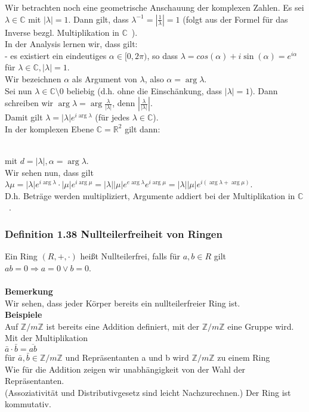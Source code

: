 \documentclass{article}
\newcommand{\lb}{\lambda}
\newcommand{\R}{\mathbb{R}}
\newcommand{\Z}{\mathbb{Z}}
\newcommand{\C}{\mathbb{C}}
\newcommand{\mR}{$\mathbb{R}$\ }
\newcommand{\mC}{$\mathbb{C}$\ }
\newcommand{\al}{\alpha}
\begin{document}
\begin{enumerate}
{Wir betrachten noch eine geometrische Anschauung der komplexen Zahlen. Es sei $\lb \in \C$ mit $|\lb| = 1$. Dann gilt, dass $\lb^{-1} = |\frac{1}{\lb}| = 1$  (folgt aus der Formel für das Inverse bezgl. Multiplikation in \mC).\\
In der Analysis lernen wir, dass gilt:\\
- es existiert ein eindeutiges $\al \in [0, 2\pi)$, so dass $\lb = cos(\al) + i \sin(\al) = e^{i\al}$ für $\lb \in \C, |\lb| = 1$.\\
Wir bezeichnen $\al$ als Argument von $\lb$, also $\al = \arg \lb$.\\
Sei nun $\lb \in \C \setminus 0$ beliebig (d.h. ohne die Einschänkung, dass $|\lb| = 1$). Dann schreiben wir $\arg \lb = \arg \frac{\lb}{|\lb|}$, denn $|\frac{\lb}{|\lb|}|$.\\
Damit gilt $\lb = |\lb| e^{i \arg \lb}$ (für jedes $\lb \in \C$).\\
In der komplexen Ebene $\C = \R^2$ gilt dann:\\
\\
mit $d = |\lb|, \al = \arg \lb$.\\
Wir sehen nun, dass gilt $\lb \mu = |\lb| e^{i \arg \lb} \cdot  |\mu| e^{i \arg \mu} = |\lb||\mu| e^{e \arg\lb} e^{i \arg \mu} = |\lb||\mu| e^{i (\arg\lb + \arg \mu)}$.\\
D.h. Beträge werden multipliziert, Argumente addiert bei der Multiplikation in \mC.
}
\end{enumerate}

\subsubsection{Definition 1.38 Nullteilerfreiheit von Ringen}
Ein Ring $(R, +, \cdot)$ hei\ss{}t Nullteilerfrei, falls für $a, b \in R$ gilt $ab = 0 \Rightarrow a = 0 \lor b = 0$.\\
\\
\textbf{Bemerkung}\\
Wir sehen, dass jeder Körper bereits ein nullteilerfreier Ring ist.\\
\textbf{Beispiele}\\
Auf $\Z/m\Z$ ist bereits eine Addition definiert, mit der $\Z/m\Z$ eine Gruppe wird. Mit der Multiplikation\\
$\bar{a} \cdot \bar{b} = \overline{ab}$\\
für $\bar{a}, \bar{b} \in \Z / m\Z$ und Repräsentanten a und b wird $\Z/m\Z$ zu einem Ring\\
Wie für die Addition zeigen wir unabhängigkeit von der Wahl der Repräsentanten.\\
(Assoziativität und Distributivgesetz sind leicht Nachzurechnen.) Der Ring ist kommutativ.
\end{document}
